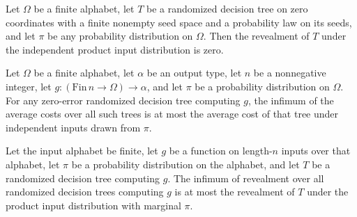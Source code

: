 \begin{theorem}
\label{FABL.RandomizedDecisionTree.revealment_zero_dimension}
\leanok
{}
Let $\Omega$ be a finite alphabet, let $T$ be a randomized decision tree on zero
coordinates with a finite nonempty seed space and a probability law on its seeds, and
let $\pi$ be any probability distribution on $\Omega$. Then the revealment of $T$ under
the independent product input distribution is zero.
\end{theorem}

\begin{theorem}
\label{FABL.RandomizedDecisionTree.averageComplexity_le_averageCost}
\leanok
{}
Let $\Omega$ be a finite alphabet, let $\alpha$ be an output type, let $n$ be a
nonnegative integer, let $g:(\mathrm{Fin}\,n\to\Omega)\to\alpha$, and let $\pi$ be a
probability distribution on $\Omega$. For any zero-error randomized decision tree
computing $g$, the infimum of the average costs over all such trees is at most the
average cost of that tree under independent inputs drawn from $\pi$.
\end{theorem}

\begin{theorem}
\label{FABL.RandomizedDecisionTree.functionRevealment_le_revealment}
\leanok
{}
Let the input alphabet be finite, let $g$ be a function on length-$n$ inputs over that
alphabet, let $\pi$ be a probability distribution on the alphabet, and let $T$ be a
randomized decision tree computing $g$. The infimum of revealment over all randomized
decision trees computing $g$ is at most the revealment of $T$ under the product input
distribution with marginal $\pi$.
\end{theorem}

